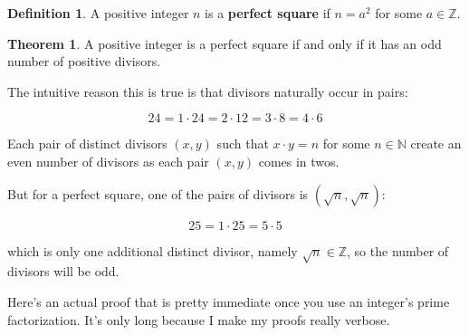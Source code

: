 \documentclass{article}
\theoremstyle{definition}
\newtheorem{definition}{Definition}[section]
\newtheorem{theorem}{Theorem}[section]
\begin{document}
\begin{definition}
A positive integer $n$ is a \textbf{perfect square} if $n = a^2$ for some $a \in \mathbb{Z}$.
\end{definition}

\begin{theorem}
A positive integer is a perfect square if and only if it has an odd number of positive divisors.
\end{theorem}

The intuitive reason this is true is that divisors naturally occur in pairs:

\begin{equation*}
24 = 1 \cdot 24 = 2 \cdot 12 = 3 \cdot 8 = 4 \cdot 6
\end{equation*}

Each pair of distinct divisors $(x, y)$ such that $x \cdot y = n$ for some $n \in \mathbb{N}$ create an even number of divisors as each pair $(x, y)$ comes in twos.

But for a perfect square, one of the pairs of divisors is $(\sqrt{n}, \sqrt{n})$:

\begin{equation*}
25 = 1 \cdot 25 = 5 \cdot 5
\end{equation*}

which is only one additional distinct divisor, namely $\sqrt{n} \in \mathbb{Z}$, so the number of divisors will be odd.

Here's an actual proof that is pretty immediate once you use an integer's prime factorization. It's only long because I make my proofs really verbose.
\end{document}
